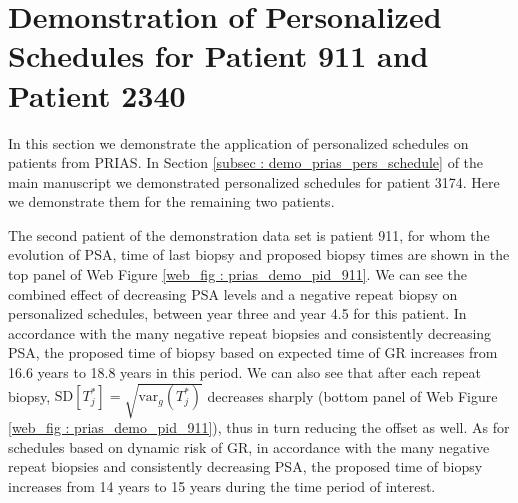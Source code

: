 
\section{Demonstration of Personalized Schedules for Patient 911 and Patient 2340}
\label{sec : demo_911_2340}

In this section we demonstrate the application of personalized schedules on patients from PRIAS. In Section \ref{subsec : demo_prias_pers_schedule} of the main manuscript we demonstrated personalized schedules for patient 3174. Here we demonstrate them for the remaining two patients.

The second patient of the demonstration data set is patient 911, for whom the evolution of PSA, time of last biopsy and proposed biopsy times are shown in the top panel of Web Figure \ref{web_fig : prias_demo_pid_911}. We can see the combined effect of decreasing PSA levels and a negative repeat biopsy on personalized schedules, between year three and year 4.5 for this patient. In accordance with the many negative repeat biopsies and consistently decreasing PSA, the proposed time of biopsy based on expected time of GR increases from 16.6 years to 18.8 years in this period. We can also see that after each repeat biopsy, $\mbox{SD}[T^*_j] = \sqrt{\mbox{var}_g(T^*_j)}$ decreases sharply (bottom panel of Web Figure \ref{web_fig : prias_demo_pid_911}), thus in turn reducing the offset as well. As for schedules based on dynamic risk of GR, in accordance with the many negative repeat biopsies and consistently decreasing PSA, the proposed time of biopsy increases from 14 years to 15 years during the time period of interest.

